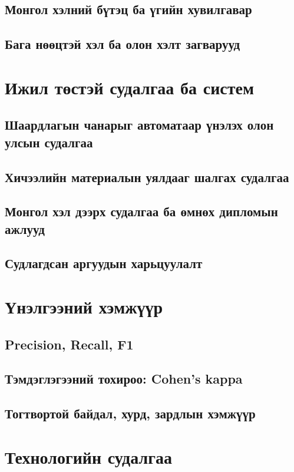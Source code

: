 \subsection{Монгол хэлний бүтэц ба үгийн хувилгавар}
\ph
\subsection{Бага нөөцтэй хэл ба олон хэлт загварууд}
\ph

\section{Ижил төстэй судалгаа ба систем} %
\subsection{Шаардлагын чанарыг автоматаар үнэлэх олон улсын судалгаа} %
\ph
\subsection{Хичээлийн материалын уялдааг шалгах судалгаа} %
\ph
\subsection{Монгол хэл дээрх судалгаа ба өмнөх дипломын ажлууд} %
\ph
\subsection{Судлагдсан аргуудын харьцуулалт}
\ph

\section{Үнэлгээний хэмжүүр} %
\subsection{Precision, Recall, F1}
\ph
\subsection{Тэмдэглэгээний тохироо: Cohen's kappa}
\ph
\subsection{Тогтвортой байдал, хурд, зардлын хэмжүүр}
\ph

\section{Технологийн судалгаа} %
